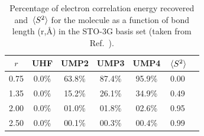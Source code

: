 \documentclass[11pt,a4paper]{article}
\begin{document}
\begin{table}
    \centering
    \caption{Percentage of electron correlation energy recovered and $\expval*{S^2}$ for the  molecule as a function of bond length (r,\si{\angstrom}) in the STO-3G basis set (taken from Ref.~\cite{Gill_1988}).}
    \begin{tabular}{ccccccc}
\hline
\hline
 $r$ & UHF & UMP2 & UMP3 & UMP4 & $\expval*{S^2}$ \\
\hline
0.75 & 0.0\% & 63.8\% & 87.4\% & 95.9\% & 0.00\\
1.35 & 0.0\% & 15.2\% & 26.1\% & 34.9\% & 0.49\\
2.00 & 0.0\% & 01.0\% & 01.8\% & 02.6\% & 0.95\\
2.50 & 0.0\% & 00.1\% & 00.3\% & 00.4\% & 0.99\\
\hline
\hline
\end{tabular}
    \label{tab:SpinContamination}
\end{table}
\end{document}
